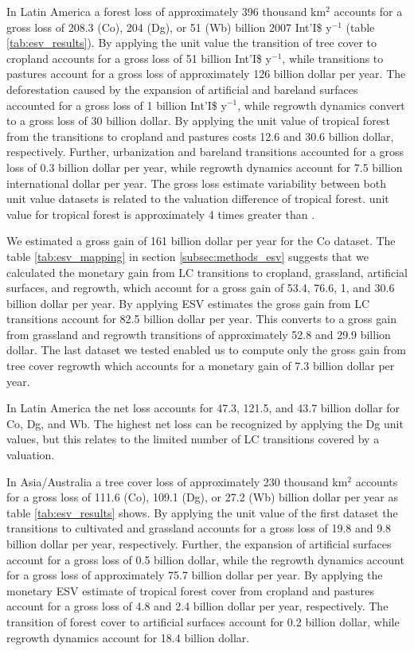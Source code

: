 		In Latin America a forest loss of approximately 396 thousand km$^2$ accounts for a gross loss of 208.3 (Co), 204 (Dg), or 51 (Wb) billion 2007 Int'I\$ y$^{-1}$ (table \ref{tab:esv_results}). By applying the \citet{Costanza2014} unit value the transition of tree cover to cropland accounts for a gross loss of 51 billion Int'I\$ y$^{-1}$, while transitions to pastures account for a gross loss of approximately 126 billion dollar per year. The deforestation caused by the expansion of artificial and bareland surfaces accounted for a gross loss of 1 billion Int'I\$ y$^{-1}$, while regrowth dynamics convert to a gross loss of 30 billion dollar. By applying the unit value of tropical forest from \citet{Siikamaki2015} the transitions to cropland and pastures costs 12.6 and 30.6 billion dollar, respectively. Further, urbanization and bareland transitions accounted for a gross loss of 0.3 billion dollar per year, while regrowth dynamics account for 7.5 billion international dollar per year. The gross loss estimate variability between both unit value datasets is related to the valuation difference of tropical forest. \citet{Costanza2014} unit value for tropical forest is approximately 4 times greater than \citet{Siikamaki2015}.

		We estimated a gross gain of 161 billion dollar per year for the Co dataset. The table \ref{tab:esv_mapping} in section \ref{subsec:methods_esv} suggests that we calculated the monetary gain from \ac{LC} transitions to cropland, grassland, artificial surfaces, and regrowth, which account for a gross gain of 53.4, 76.6, 1, and 30.6 billion dollar per year. By applying \citet{Groot2012} \ac{ESV} estimates the gross gain from \ac{LC} transitions account for 82.5 billion dollar per year. This converts to a gross gain from grassland and regrowth transitions of approximately 52.8 and 29.9 billion dollar. The last dataset we tested enabled us to compute only the gross gain from tree cover regrowth which accounts for a monetary gain of 7.3 billion dollar per year.

		In Latin America the net loss accounts for 47.3, 121.5, and 43.7 billion dollar for Co, Dg, and Wb. The highest net loss can be recognized by applying the Dg unit values, but this relates to the limited number of \ac{LC} transitions covered by a valuation.

		In Asia/Australia a tree cover loss of approximately 230 thousand km$^2$ accounts for a gross loss of 111.6 (Co), 109.1 (Dg), or 27.2 (Wb) billion dollar per year as table \ref{tab:esv_results} shows. By applying the unit value of the first dataset the transitions to cultivated and grassland accounts for a gross loss of 19.8 and 9.8 billion dollar per year, respectively. Further, the expansion of artificial surfaces account for a gross loss of 0.5 billion dollar, while the regrowth dynamics account for a gross loss of approximately 75.7 billion dollar per year. By applying the monetary \ac{ESV} estimate of tropical forest cover from \citet{Siikamaki2015} cropland and pastures account for a gross loss of 4.8 and 2.4 billion dollar per year, respectively. The transition of forest cover to artificial surfaces account for 0.2 billion dollar, while regrowth dynamics account for 18.4 billion dollar.

